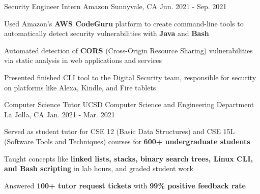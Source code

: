 

\begin{cventries}

\cventry
  {Security Engineer Intern} %
  {Amazon} %
  {Sunnyvale, CA} %
  {Jun. 2021 - Sep. 2021} %
  {
    \begin{cvitems} %
      \item {Used Amazon's \textbf{AWS CodeGuru} platform to create command-line tools to automatically detect security vulnerabilities with \textbf{Java} and \textbf{Bash}}
      \item {Automated detection of \textbf{CORS} (Cross-Origin Resource Sharing) vulnerabilities via static analysis in web applications and services}
      \item {Presented finished CLI tool to the Digital Security team, responsible for security on platforms like Alexa, Kindle, and Fire tablets}
    \end{cvitems}
  }

  \cventry
    {Computer Science Tutor} %
    {UCSD Computer Science and Engineering Department} %
    {La Jolla, CA} %
    {Jan. 2021 - Mar. 2021} %
    {
      \begin{cvitems} %
        \item {Served as student tutor for CSE 12 (Basic Data Structures) and CSE 15L (Software Tools and Techniques) courses for \textbf{600+ undergraduate students}}
        \item {Taught concepts like \textbf{linked lists, stacks, binary search trees, Linux CLI, and Bash scripting} in lab hours, and graded student work}
        \item {Answered \textbf{100+ tutor request tickets} with \textbf{99\% positive feedback rate}}
      \end{cvitems}
    }



\end{cventries}
